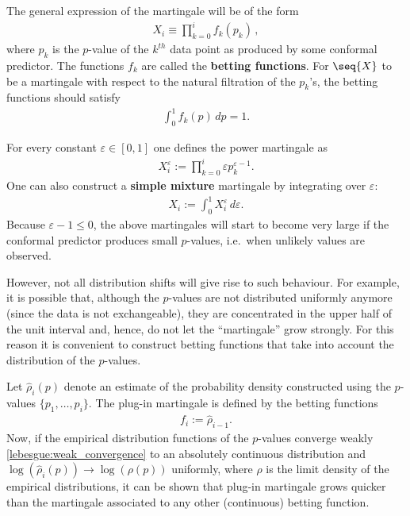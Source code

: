     The general expression of the martingale will be of the form
    \begin{gather}
        X_i\equiv\prod_{k=0}^if_k(p_k)\,,
    \end{gather}
    where $p_k$ is the $p$-value of the $k^{th}$ data point as produced by some conformal predictor. The functions $f_k$ are called the \textbf{betting functions}. For $\seq{X}$ to be a martingale with respect to the natural filtration of the $p_k$'s, the betting functions should satisfy
    \begin{gather}
        \int_0^1f_k(p)\,dp = 1.
    \end{gather}

    \begin{method}
        For every constant $\varepsilon\in[0,1]$ one defines the power martingale as
        \begin{gather}
            X^\varepsilon_i := \prod_{k=0}^i\varepsilon p^{\varepsilon-1}_k.
        \end{gather}
        One can also construct a \textbf{simple mixture} martingale by integrating over $\varepsilon$:
        \begin{gather}
            X_i := \int_0^1X^\varepsilon_i\,d\varepsilon.
        \end{gather}
        Because $\varepsilon-1\leq0$, the above martingales will start to become very large if the conformal predictor produces small $p$-values, i.e.~when unlikely values are observed.
    \end{method}
    However, not all distribution shifts will give rise to such behaviour. For example, it is possible that, although the $p$-values are not distributed uniformly anymore (since the data is not exchangeable), they are concentrated in the upper half of the unit interval and, hence, do not let the ``martingale'' grow strongly. For this reason it is convenient to construct betting functions that take into account the distribution of the $p$-values.
    \begin{method}
        Let $\widehat{\rho}_i(p)$ denote an estimate of the probability density constructed using the $p$-values $\{p_1,\ldots,p_i\}$. The plug-in martingale is defined by the betting functions
        \begin{gather}
            f_i := \widehat{\rho}_{i-1}.
        \end{gather}
        Now, if the empirical distribution functions of the $p$-values converge weakly \ref{lebesgue:weak_convergence} to an absolutely continuous distribution and $\log(\widehat{\rho}_i(p))\longrightarrow\log(\rho(p))$ uniformly, where $\rho$ is the limit density of the empirical distributions, it can be shown that plug-in martingale grows quicker than the martingale associated to any other (continuous) betting function.
    \end{method}

